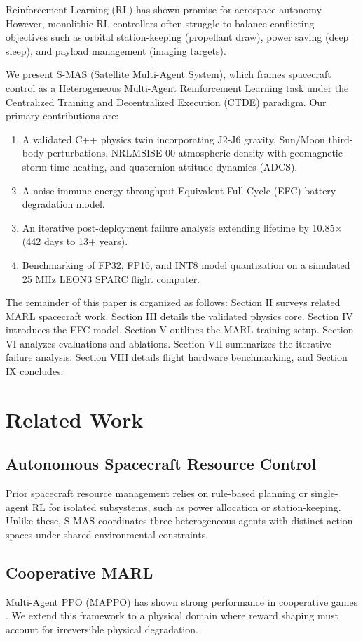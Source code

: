 \documentclass[conference]{IEEEtran}
\begin{document}
Reinforcement Learning (RL) has shown promise for aerospace autonomy. However, monolithic RL controllers often struggle to balance conflicting objectives such as orbital station-keeping (propellant draw), power saving (deep sleep), and payload management (imaging targets). 

We present S-MAS (Satellite Multi-Agent System), which frames spacecraft control as a Heterogeneous Multi-Agent Reinforcement Learning task under the Centralized Training and Decentralized Execution (CTDE) paradigm. Our primary contributions are:
\begin{enumerate}
    \item A validated C++ physics twin incorporating J2-J6 gravity, Sun/Moon third-body perturbations, NRLMSISE-00 atmospheric density with geomagnetic storm-time heating, and quaternion attitude dynamics (ADCS).
    \item A noise-immune energy-throughput Equivalent Full Cycle (EFC) battery degradation model.
    \item An iterative post-deployment failure analysis extending lifetime by 10.85$\times$ (442 days to 13+ years).
    \item Benchmarking of FP32, FP16, and INT8 model quantization on a simulated 25 MHz LEON3 SPARC flight computer.
\end{enumerate}

The remainder of this paper is organized as follows: Section II surveys related MARL spacecraft work. Section III details the validated physics core. Section IV introduces the EFC model. Section V outlines the MARL training setup. Section VI analyzes evaluations and ablations. Section VII summarizes the iterative failure analysis. Section VIII details flight hardware benchmarking, and Section IX concludes.

\section{Related Work}
\subsection{Autonomous Spacecraft Resource Control}
Prior spacecraft resource management relies on rule-based planning or single-agent RL for isolated subsystems, such as power allocation or station-keeping. Unlike these, S-MAS coordinates three heterogeneous agents with distinct action spaces under shared environmental constraints.

\subsection{Cooperative MARL}
Multi-Agent PPO (MAPPO) has shown strong performance in cooperative games \cite{yu2022surprising}. We extend this framework to a physical domain where reward shaping must account for irreversible physical degradation.
\end{document}
